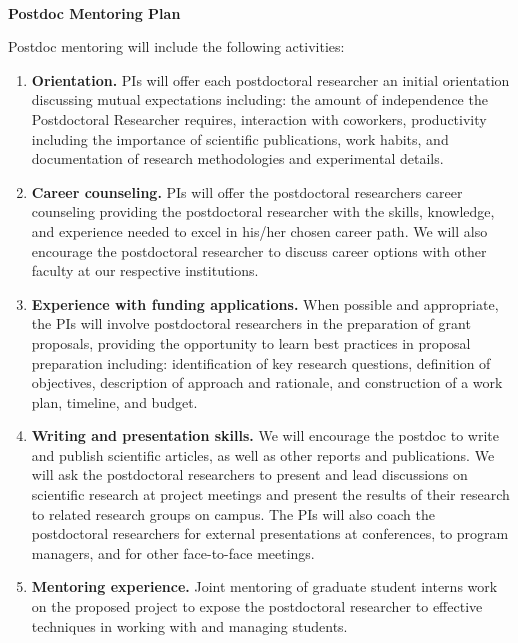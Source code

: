 \begin{center} 
    {\large \bf \TITLE } \\ 
    {\bf Postdoc Mentoring Plan}
\end{center} 

Postdoc mentoring will include the
following activities:

\begin{enumerate}
    \itemsep=-1pt
    \item {\bf Orientation.} PIs will offer each postdoctoral researcher an
        initial orientation discussing mutual expectations including: the
        amount of independence the Postdoctoral Researcher requires,
        interaction with coworkers, productivity including the importance of
        scientific publications, work habits, and documentation of research
        methodologies and experimental details.

    \item {\bf Career counseling.} PIs will offer the postdoctoral researchers
        career counseling providing the postdoctoral researcher with the
        skills, knowledge, and experience needed to excel in his/her chosen
        career path.  We will also encourage the postdoctoral researcher to
        discuss career options with other faculty at our respective
        institutions. 

\item {\bf Experience with funding applications.} When possible and
    appropriate, the PIs will involve postdoctoral researchers in the
        preparation of grant proposals, providing the opportunity to learn
        best practices in proposal preparation including: identification of
        key research questions, definition of objectives, description of
        approach and rationale, and construction of a work plan, timeline, and
        budget.

    \item {\bf Writing and presentation skills. }
       We will encourage the postdoc to write and publish scientific articles,
        as well as other reports and publications.  We will ask the
        postdoctoral researchers to present and lead discussions on scientific
        research at project meetings and present the results of their research
        to related research groups on campus. The PIs will also coach the
        postdoctoral researchers for external presentations at conferences, to
        program managers, and for other face-to-face meetings. 

\item {\bf Mentoring experience.} 
    Joint mentoring of graduate student interns work on the proposed project
    to expose the postdoctoral researcher to effective techniques in working
        with and managing students.


\end{enumerate}
